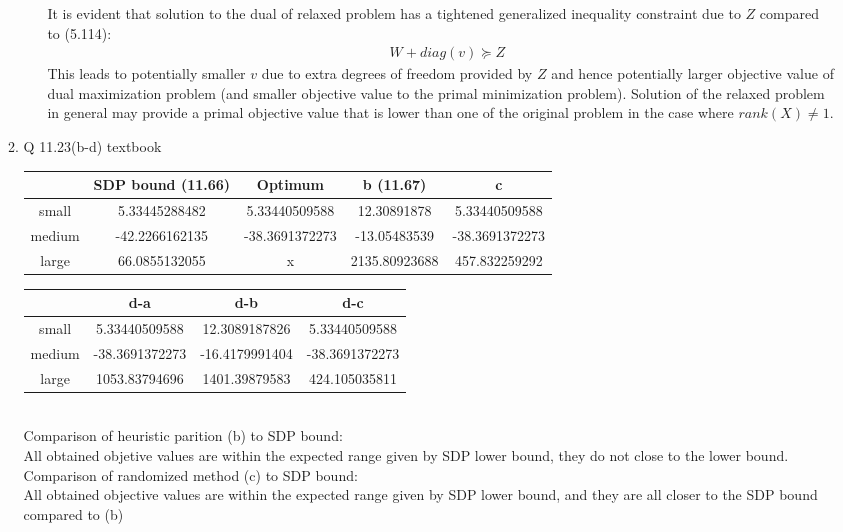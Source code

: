 \documentclass[12pt,letter]{article}
\begin{document}
\begin{enumerate}
\begin{enumerate}
\begin{enumerate}
      It is evident that solution to the dual of relaxed problem has a tightened generalized inequality constraint due to $Z$ compared to (5.114):
      \begin{align*}
        &W + diag(v) \succeq Z
      \end{align*}
      This leads to potentially smaller $v$ due to extra degrees of freedom provided by $Z$ and hence potentially larger objective value of dual maximization problem (and smaller objective value to the primal minimization problem). Solution of the relaxed problem in general may provide a primal objective value that is lower than one of the original problem in the case where $rank(X)\not=1$.
    \end{enumerate}
    
  \pagebreak
  
\item Q 11.23(b-d) textbook\\
  
  \begin{tabular}{|c|c|c|c|c|}\hline
          & SDP bound (11.66)& Optimum & b (11.67)& c \\ \hline
    small & 5.33445288482 & 5.33440509588 & 12.30891878 & 5.33440509588\\ \hline
    medium & -42.2266162135 & -38.3691372273  & -13.05483539 & -38.3691372273\\ \hline
    large & 66.0855132055 & x & 2135.80923688 & 457.832259292\\ \hline
  \end{tabular}

    \begin{tabular}{|c|c|c|c|}\hline
      & d-a & d-b & d-c\\ \hline
      small & 5.33440509588 & 12.3089187826 &5.33440509588\\ \hline
      medium & -38.3691372273& -16.4179991404 &-38.3691372273 \\ \hline
      large & 1053.83794696& 1401.39879583 &424.105035811\\ \hline
    \end{tabular}\\

    Comparison of heuristic parition (b) to SDP bound:\\
    All obtained objetive values are within the expected range given by SDP lower bound, they do not close to the lower bound.\\

    Comparison of randomized method (c) to SDP bound:\\
    All obtained objective values are within the expected range given by SDP lower bound, and they are all closer to the SDP bound compared to (b)\\


\end{enumerate}
\end{enumerate}
\end{document}
